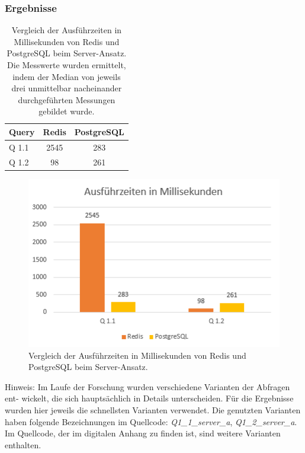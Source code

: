 \subsubsection{Ergebnisse}

\begin{table}[h]
\centering
\begin{tabular}{lcc}
\hline
Query & Redis & PostgreSQL \\ \hline
Q 1.1 & 2545  & 283       \\
Q 1.2 & 98    & 261       \\ \hline
\end{tabular}
\caption{Vergleich der Ausführzeiten in Millisekunden von Redis und PostgreSQL beim Server-Ansatz.\\
 Die Messwerte wurden ermittelt, indem der Median von jeweils drei unmittelbar nacheinander durchgeführten Messungen gebildet wurde.}
\label{tab:results-server}
\end{table}

\begin{figure}[ht]  %
    \centering      %
    \includegraphics[width=1\textwidth]{pictures/results/results-server.png}
    \caption{Vergleich der Ausführzeiten in Millisekunden von Redis und PostgreSQL beim Server-Ansatz.}      %
    \label{pic:results-server}    %
\end{figure}

Hinweis: Im Laufe der Forschung wurden verschiedene Varianten der Abfragen ent-
wickelt, die sich hauptsächlich in Details unterscheiden. Für die Ergebnisse wurden
hier jeweils die schnellsten Varianten verwendet. Die
genutzten Varianten haben folgende Bezeichnungen im Quellcode: \emph{Q1\_1\_server\_a}, \emph{Q1\_2\_server\_a}. Im Quellcode,
der im digitalen Anhang zu finden ist, sind weitere Varianten enthalten.


